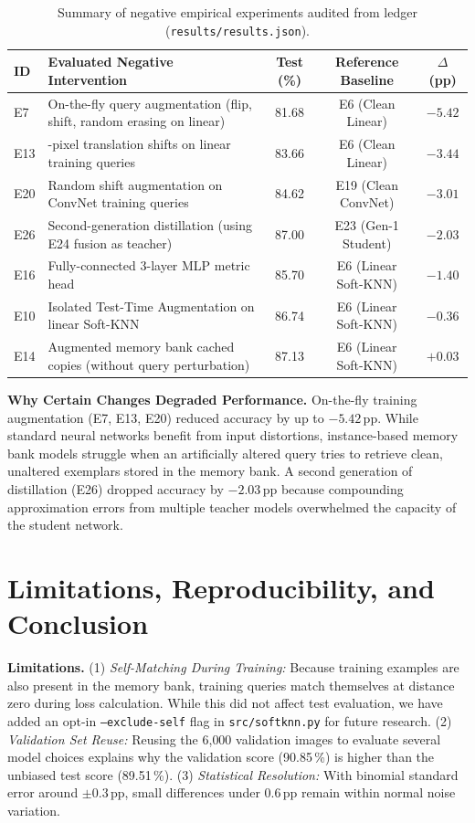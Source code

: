 \documentclass[10pt,a4paper]{article}
\newcommand{\file}[1]{\nolinkurl{#1}}
\begin{document}
\begin{table}[!htb]
\centering\footnotesize
\caption{Summary of negative empirical experiments audited from ledger (\file{results/results.json}).}
\label{tab:negative}
\begin{tabular}{@{}l>{\raggedright\arraybackslash}p{}ccc@{}}
\toprule
ID & Evaluated Negative Intervention & Test (\%) & Reference Baseline & $\Delta$ (pp) \\
\midrule
E7  & On-the-fly query augmentation (flip, shift, random erasing on linear) & 81.68 & E6 (Clean Linear) & $-5.42$ \\
E13 & 2-pixel translation shifts on linear training queries & 83.66 & E6 (Clean Linear) & $-3.44$ \\
E20 & Random shift augmentation on ConvNet training queries & 84.62 & E19 (Clean ConvNet) & $-3.01$ \\
E26 & Second-generation distillation (using E24 fusion as teacher) & 87.00 & E23 (Gen-1 Student) & $-2.03$ \\
E16 & Fully-connected 3-layer MLP metric head & 85.70 & E6 (Linear Soft-KNN) & $-1.40$ \\
E10 & Isolated Test-Time Augmentation on linear Soft-KNN & 86.74 & E6 (Linear Soft-KNN) & $-0.36$ \\
E14 & Augmented memory bank cached copies (without query perturbation) & 87.13 & E6 (Linear Soft-KNN) & $+0.03$ \\
\bottomrule
\end{tabular}
\end{table}

\textbf{Why Certain Changes Degraded Performance.} On-the-fly training augmentation (E7, E13, E20) reduced accuracy by up to $-5.42$\,pp. While standard neural networks benefit from input distortions, instance-based memory bank models struggle when an artificially altered query tries to retrieve clean, unaltered exemplars stored in the memory bank. A second generation of distillation (E26) dropped accuracy by $-2.03$\,pp because compounding approximation errors from multiple teacher models overwhelmed the capacity of the student network.

\section{Limitations, Reproducibility, and Conclusion}\label{sec:conclusion}
\textbf{Limitations.} (1) \emph{Self-Matching During Training:} Because training examples are also present in the memory bank, training queries match themselves at distance zero during loss calculation. While this did not affect test evaluation, we have added an opt-in \texttt{--exclude-self} flag in \file{src/softknn.py} for future research. (2) \emph{Validation Set Reuse:} Reusing the 6{,}000 validation images to evaluate several model choices explains why the validation score (90.85\,\%) is higher than the unbiased test score (89.51\,\%). (3) \emph{Statistical Resolution:} With binomial standard error around $\pm0.3$\,pp, small differences under 0.6\,pp remain within normal noise variation.
\end{document}
